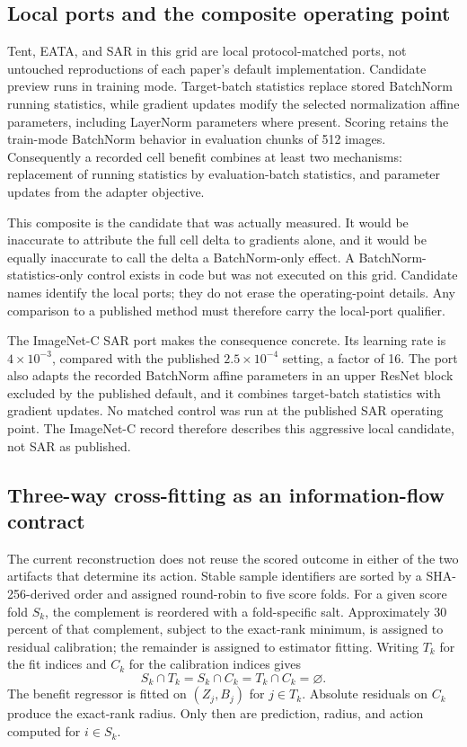\subsection{Local ports and the composite operating point}
\label{fr:sec-cifar-operating-point}

Tent, EATA, and SAR in this grid are local protocol-matched ports, not untouched reproductions of
each paper's default implementation.  Candidate preview runs in training mode.  Target-batch
statistics replace stored BatchNorm running statistics, while gradient updates modify the selected
normalization affine parameters, including LayerNorm parameters where present.  Scoring retains
the train-mode BatchNorm behavior in evaluation chunks of 512 images.  Consequently a recorded
cell benefit combines at least two mechanisms: replacement of running statistics by
evaluation-batch statistics, and parameter updates from the adapter objective.

This composite is the candidate that was actually measured.  It would be inaccurate to attribute
the full cell delta to gradients alone, and it would be equally inaccurate to call the delta a
BatchNorm-only effect.  A BatchNorm-statistics-only control exists in code but was not executed on
this grid.  Candidate names identify the local ports; they do not erase the operating-point
details.  Any comparison to a published method must therefore carry the local-port qualifier.

The ImageNet-C SAR port makes the consequence concrete.  Its learning rate is
$4\times10^{-3}$, compared with the published $2.5\times10^{-4}$ setting, a factor of 16.  The port
also adapts the recorded BatchNorm affine parameters in an upper ResNet block excluded by the
published default, and it combines target-batch statistics with gradient updates.  No matched
control was run at the published SAR operating point.  The ImageNet-C record therefore describes
this aggressive local candidate, not SAR as published.

\subsection{Three-way cross-fitting as an information-flow contract}
\label{fr:sec-three-way-crossfit}

The current reconstruction does not reuse the scored outcome in either of the two artifacts that
determine its action.  Stable sample identifiers are sorted by a SHA-256-derived order and assigned
round-robin to five score folds.  For a given score fold $S_k$, the complement is reordered with a
fold-specific salt.  Approximately 30 percent of that complement, subject to the exact-rank minimum,
is assigned to residual calibration; the remainder is assigned to estimator fitting.  Writing
$T_k$ for the fit indices and $C_k$ for the calibration indices gives
\begin{equation}
  S_k\cap T_k=S_k\cap C_k=T_k\cap C_k=\varnothing.
\label{fr:eq-three-way-disjoint}
\end{equation}
The benefit regressor is fitted on $(Z_j,B_j)$ for $j\in T_k$.  Absolute residuals on $C_k$ produce
the exact-rank radius.  Only then are prediction, radius, and action computed for $i\in S_k$.

